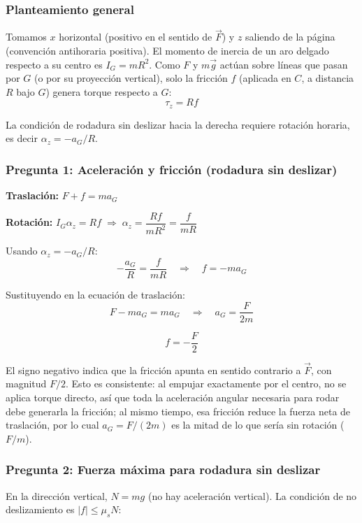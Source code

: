 \begin{sol}

\subsubsection*{Planteamiento general}

Tomamos $x$ horizontal (positivo en el sentido de $\vec{F}$) y $z$ saliendo de la página (convención antihoraria positiva). El momento de inercia de un aro delgado respecto a su centro es $I_G = mR^2$. Como $F$ y $m\vec{g}$ actúan sobre líneas que pasan por $G$ (o por su proyección vertical), solo la fricción $f$ (aplicada en $C$, a distancia $R$ bajo $G$) genera torque respecto a $G$:
$$\tau_z = R f$$

La condición de rodadura sin deslizar hacia la derecha requiere rotación horaria, es decir $\alpha_z = -a_G/R$.

\subsubsection*{Pregunta 1: Aceleración y fricción (rodadura sin deslizar)}

\textbf{Traslación:} $F + f = ma_G$

\textbf{Rotación:} $I_G\alpha_z = Rf \;\Rightarrow\; \alpha_z = \dfrac{Rf}{mR^2} = \dfrac{f}{mR}$

Usando $\alpha_z = -a_G/R$:
$$-\frac{a_G}{R} = \frac{f}{mR} \quad\Rightarrow\quad f = -ma_G$$

Sustituyendo en la ecuación de traslación:
$$F - ma_G = ma_G \quad\Rightarrow\quad \boxed{a_G = \frac{F}{2m}}$$

$$\boxed{f = -\frac{F}{2}}$$

El signo negativo indica que la fricción apunta en sentido contrario a $\vec{F}$, con magnitud $F/2$. Esto es consistente: al empujar exactamente por el centro, no se aplica torque directo, así que toda la aceleración angular necesaria para rodar debe generarla la fricción; al mismo tiempo, esa fricción reduce la fuerza neta de traslación, por lo cual $a_G = F/(2m)$ es la mitad de lo que sería sin rotación ($F/m$).

\subsubsection*{Pregunta 2: Fuerza máxima para rodadura sin deslizar}

En la dirección vertical, $N = mg$ (no hay aceleración vertical). La condición de no deslizamiento es $|f| \leq \mu_s N$:


\end{sol}
